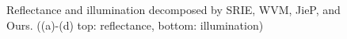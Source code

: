 \begin{figure}[t]
\begin{minipage}[b]{0.49\hsize}
	 \label{fig. decomp_prop}
	\end{minipage}
	\caption{Reflectance and illumination decomposed by SRIE, WVM, JieP, and Ours. ((a)-(d) top: reflectance, bottom: illumination)}
	\label{fig:decomposition}
\end{figure}